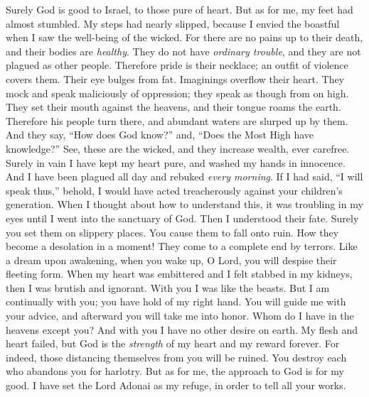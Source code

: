 \begin{biblechapter} %
 Surely God is good to Israel, 
to those pure of heart.
\verse But as for me, my feet had almost stumbled. 
My steps had nearly slipped,
\verse because I envied the boastful 
when I saw the well-being of the wicked.
\verse For there are no pains up to their death, 
and their bodies are \textit{healthy}.
\verse They do not have \textit{ordinary trouble}, 
and they are not plagued as other people.
\verse Therefore pride is their necklace; 
an outfit of violence covers them.
\verse Their eye bulges from fat. 
Imaginings overflow their heart.
\verse They mock and speak maliciously of oppression; 
they speak as though from on high.
\verse They set their mouth against the heavens, 
and their tongue roams the earth.
\verse Therefore his people turn there, 
and abundant waters are slurped up by them.
\verse And they say, “How does God know?” 
and, “Does the Most High have knowledge?”
\verse See, these are the wicked, 
and they increase wealth, ever carefree.
\verse Surely in vain I have kept my heart pure, 
and washed my hands in innocence.
\verse And I have been plagued all day 
and rebuked \textit{every morning}.
\verse If I had said, “I will speak thus,” 
behold, I would have acted treacherously 
against your children’s generation.
\verse When I thought about how to understand this, 
it was troubling in my eyes
\verse until I went into the sanctuary of God. 
Then I understood their fate.
\verse Surely you set them on slippery places. 
You cause them to fall onto ruin.
\verse How they become a desolation in a moment! 
They come to a complete end by terrors.
\verse Like a dream upon awakening, 
when you wake up, O Lord, 
you will despise their fleeting form.
\verse When my heart was embittered 
and I felt stabbed in my kidneys,
\verse then I was brutish and ignorant. 
With you I was like the beasts.
\verse But I am continually with you; 
you have hold of my right hand.
\verse You will guide me with your advice, 
and afterward you will take me into honor.
\verse Whom do I have in the heavens except you? 
And with you I have no other desire on earth.
\verse My flesh and heart failed, 
but God is the \textit{strength} of my heart and my reward forever.
\verse For indeed, those distancing themselves from you will be ruined. 
You destroy each who abandons you for harlotry.
\verse But as for me, the approach to God is for my good. 
I have set the Lord Adonai as my refuge, 
in order to tell all your works.
\end{biblechapter}

